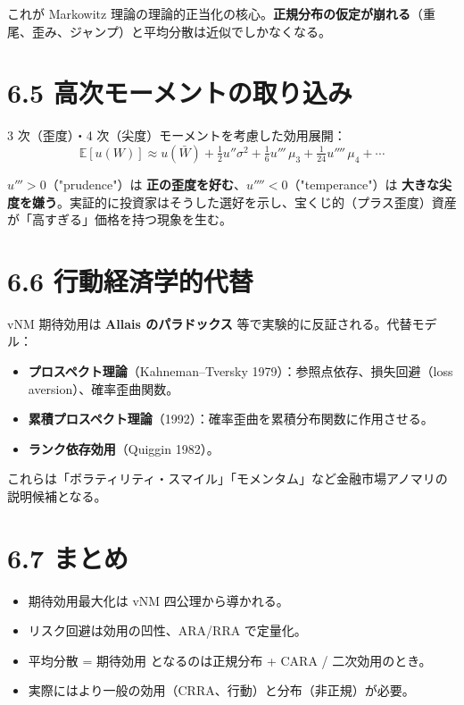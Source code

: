 \documentclass[11pt,a4paper]{report}
\begin{document}
これが Markowitz 理論の理論的正当化の核心。\textbf{正規分布の仮定が崩れる}（重尾、歪み、ジャンプ）と平均分散は近似でしかなくなる。

\section{6.5 高次モーメントの取り込み}

3 次（歪度）・4 次（尖度）モーメントを考慮した効用展開： \[ \mathbb{E}[u(W)] \approx u(\bar W) + \tfrac{1}{2} u''\sigma^2 + \tfrac{1}{6} u'''\, \mu_3 + \tfrac{1}{24} u''''\, \mu_4 + \cdots \]

$u''' > 0$（"prudence"）は \textbf{正の歪度を好む}、$u'''' < 0$（"temperance"）は \textbf{大きな尖度を嫌う}。実証的に投資家はそうした選好を示し、宝くじ的（プラス歪度）資産が「高すぎる」価格を持つ現象を生む。

\section{6.6 行動経済学的代替}

vNM 期待効用は \textbf{Allais のパラドックス} 等で実験的に反証される。代替モデル：

\begin{itemize}
\item \textbf{プロスペクト理論}（Kahneman–Tversky 1979）：参照点依存、損失回避（loss aversion）、確率歪曲関数。
\item \textbf{累積プロスペクト理論}（1992）：確率歪曲を累積分布関数に作用させる。
\item \textbf{ランク依存効用}（Quiggin 1982）。
\end{itemize}

これらは「ボラティリティ・スマイル」「モメンタム」など金融市場アノマリの説明候補となる。

\section{6.7 まとめ}

\begin{itemize}
\item 期待効用最大化は vNM 四公理から導かれる。
\item リスク回避は効用の凹性、ARA/RRA で定量化。
\item 平均分散 = 期待効用 となるのは正規分布 + CARA / 二次効用のとき。
\item 実際にはより一般の効用（CRRA、行動）と分布（非正規）が必要。
\end{itemize}
\end{document}
